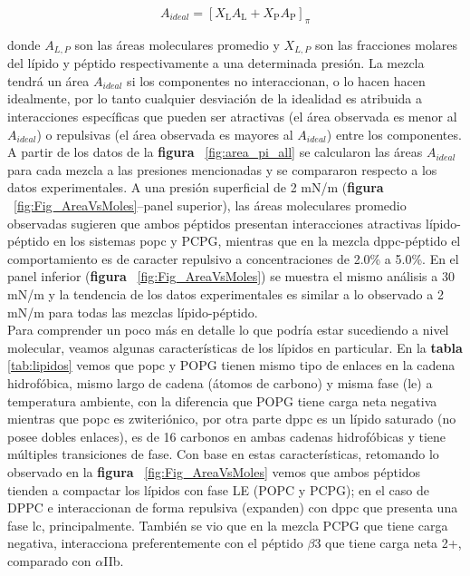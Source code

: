 \begin{equation}
    \label{ecua:Aideal}
    A_{ideal} = \left[X_{\text{L}}A_{\text{L}} + X_{\text{P}}A_{\text{P}}\right]_\pi
\end{equation}

donde $A_{L,P}$ son las áreas moleculares promedio y $X_{L,P}$ son las fracciones molares del lípido y péptido respectivamente a una determinada presión. La mezcla tendrá un área $A_{ideal}$ si los componentes no interaccionan, o lo hacen hacen idealmente, por lo tanto cualquier desviación de la idealidad es atribuida a interacciones específicas que pueden ser atractivas (el área observada es menor al $A_{ideal}$) o repulsivas (el área observada es mayores al $A_{ideal}$) entre los componentes. 
A partir de los datos de la \textbf{figura} ~\ref{fig:area_pi_all} se calcularon las áreas $A_{ideal}$  para cada mezcla a las presiones mencionadas y se compararon  respecto a los datos experimentales.
A una presión superficial de 2 mN/m (\textbf{figura} ~\ref{fig:Fig_AreaVsMoles}--panel superior), las áreas moleculares promedio observadas sugieren que ambos péptidos presentan interacciones atractivas lípido-péptido en los sistemas \ac{popc} y PCPG, mientras que en la mezcla \ac{dppc}-péptido el comportamiento es de caracter repulsivo a concentraciones de 2.0\% a 5.0\%.
En el panel inferior (\textbf{figura} ~\ref{fig:Fig_AreaVsMoles}) se muestra el mismo análisis a 30 mN/m y la tendencia de los datos experimentales es similar a lo observado a 2 mN/m para todas las mezclas lípido-péptido.\\



Para comprender un poco más en detalle lo que podría estar sucediendo a nivel molecular, veamos algunas características de los lípidos en particular. En la \textbf{tabla} \ref{tab:lipidos} vemos que \ac{popc} y POPG tienen mismo tipo de enlaces en la cadena hidrofóbica, mismo largo de cadena (átomos de carbono) y misma fase (\ac{le}) a temperatura ambiente, con la diferencia que POPG tiene carga neta negativa mientras que \ac{popc} es zwiteriónico, por otra parte \ac{dppc} es un lípido saturado (no posee dobles enlaces), es de 16 carbonos en ambas cadenas hidrofóbicas y tiene múltiples transiciones de fase. Con base en estas características, retomando lo observado en la \textbf{figura} ~\ref{fig:Fig_AreaVsMoles} vemos que ambos péptidos tienden a compactar los lípidos con fase LE (POPC y PCPG); en el caso de DPPC e interaccionan de forma repulsiva (expanden)  con \ac{dppc} que presenta una fase \ac{lc}, principalmente. También se vio que en la mezcla PCPG que tiene carga negativa, interacciona preferentemente con el péptido $\beta$3 que tiene carga neta 2+, comparado con $\alpha$IIb.

